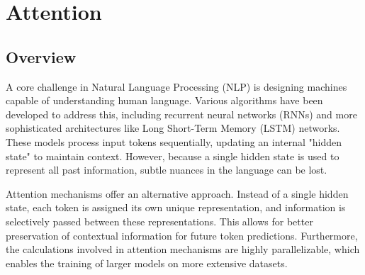 \chapter{Attention} \label{chap:attention}

\section{Overview}

A core challenge in Natural Language Processing (NLP) is designing machines capable of understanding human language. Various algorithms have been developed to address this, including recurrent neural networks (RNNs) and more sophisticated architectures like Long Short-Term Memory (LSTM) networks. These models process input tokens sequentially, updating an internal "hidden state" to maintain context. However, because a single hidden state is used to represent all past information, subtle nuances in the language can be lost.

Attention mechanisms offer an alternative approach. Instead of a single hidden state, each token is assigned its own unique representation, and information is selectively passed between these representations. This allows for better preservation of contextual information for future token predictions. Furthermore, the calculations involved in attention mechanisms are highly parallelizable, which enables the training of larger models on more extensive datasets.



